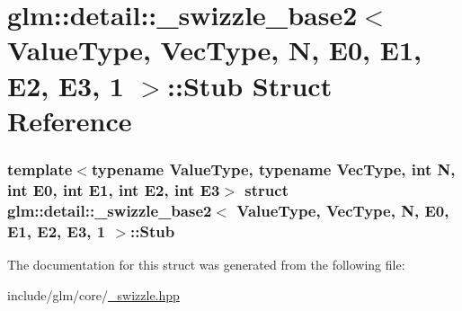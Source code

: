 \hypertarget{structglm_1_1detail_1_1__swizzle__base2_3_01ValueType_00_01VecType_00_01N_00_01E0_00_01E1_00_01E2_00_01E3_00_011_01_4_1_1Stub}{\section{glm\-:\-:detail\-:\-:\-\_\-swizzle\-\_\-base2$<$ \-Value\-Type, \-Vec\-Type, \-N, \-E0, \-E1, \-E2, \-E3, 1 $>$\-:\-:\-Stub \-Struct \-Reference}
\label{structglm_1_1detail_1_1__swizzle__base2_3_01ValueType_00_01VecType_00_01N_00_01E0_00_01E1_00_01E2_00_01E3_00_011_01_4_1_1Stub}
}
\subsubsection*{template$<$typename Value\-Type, typename Vec\-Type, int \-N, int \-E0, int \-E1, int \-E2, int \-E3$>$ struct glm\-::detail\-::\-\_\-swizzle\-\_\-base2$<$ Value\-Type, Vec\-Type, N, E0, E1, E2, E3, 1 $>$\-::\-Stub}



\-The documentation for this struct was generated from the following file\-:\begin{DoxyCompactItemize}
\item 
include/glm/core/\hyperlink{__swizzle_8hpp}{\-\_\-swizzle.\-hpp}\end{DoxyCompactItemize}
